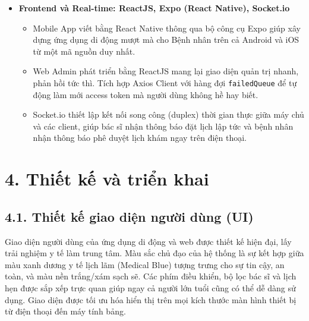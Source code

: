 \documentclass[12pt,a4paper]{report}
\begin{document}
\begin{itemize}
\item \textbf{Frontend và Real-time: ReactJS, Expo (React Native), Socket.io}
\begin{itemize}
    \item Mobile App viết bằng React Native thông qua bộ công cụ Expo giúp xây dựng ứng dụng di động mượt mà cho Bệnh nhân trên cả Android và iOS từ một mã nguồn duy nhất.
    \item Web Admin phát triển bằng ReactJS mang lại giao diện quản trị nhanh, phản hồi tức thì. Tích hợp Axios Client với hàng đợi \texttt{failedQueue} để tự động làm mới access token mà người dùng không hề hay biết.
    \item Socket.io thiết lập kết nối song công (duplex) thời gian thực giữa máy chủ và các client, giúp bác sĩ nhận thông báo đặt lịch lập tức và bệnh nhân nhận thông báo phê duyệt lịch khám ngay trên điện thoại.
\end{itemize}
\end{itemize}

\newpage

\section*{4. Thiết kế và triển khai}
\subsection*{4.1. Thiết kế giao diện người dùng (UI)}
\hspace{1em} Giao diện người dùng của ứng dụng di động và web được thiết kế hiện đại, lấy trải nghiệm y tế làm trung tâm. Màu sắc chủ đạo của hệ thống là sự kết hợp giữa màu xanh dương y tế lịch lãm (Medical Blue) tượng trưng cho sự tin cậy, an toàn, và màu nền trắng/xám sạch sẽ. Các phím điều khiển, bộ lọc bác sĩ và lịch hẹn được sắp xếp trực quan giúp ngay cả người lớn tuổi cũng có thể dễ dàng sử dụng. Giao diện được tối ưu hóa hiển thị trên mọi kích thước màn hình thiết bị từ điện thoại đến máy tính bảng.
\end{document}
